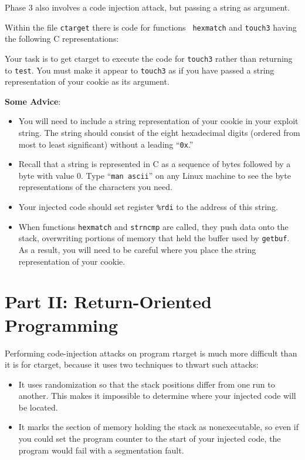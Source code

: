 \documentclass[11pt]{article}
\newcommand{\reg}[1]{\textrm{\texttt{\%#1}}}
\newcommand{\rdireg}{\reg{rdi}}
\newenvironment{ccode}%
{\small}%
{}
\begin{document}
Phase 3 also involves a code injection attack, but passing a string as argument.

Within the file {\tt ctarget} there is code for functions {\tt
  hexmatch} and {\tt touch3}
having the following C representations:

\begin{ccode}

\end{ccode}

Your task is to get {\sc ctarget} to execute the
code for {\tt touch3} rather than returning to {\tt test}.
You must make it appear to {\tt touch3} as if you have
passed a string representation of your cookie as its argument.

{\bf Some Advice}:
\begin{itemize}

\item You will need to include a string representation of your cookie
  in your exploit string.  The string should consist of the eight hexadecimal
  digits (ordered from most to least significant) without a leading ``\texttt{0x}.''

\item Recall that a string is represented in C as a sequence of bytes
  followed by a byte with value 0.  Type ``\texttt{man ascii}'' on any Linux
  machine to see the byte representations of the characters you need.

\item Your injected code should set register
\rdireg{}
to the address of this string.

\item When functions {\tt hexmatch} and {\tt strncmp} are called, they
  push data onto the stack, overwriting portions of memory that held
  the buffer used by {\tt getbuf}.  As a result, you will need to be careful where
  you place the string representation of your cookie.
\end{itemize}



\section{Part II: Return-Oriented Programming}

Performing code-injection attacks on program {\sc rtarget} is much
more difficult than it is for {\sc ctarget}, because it uses
two techniques to thwart such attacks:
\begin{itemize}
\item It uses randomization so that the stack positions differ from
  one run to another.  This makes it impossible to determine where your
  injected code will be located.
\item It marks the section of memory holding the stack as
  nonexecutable, so even if you could set the program counter to the
  start of your injected code, the program would fail with a
  segmentation fault.
\end{itemize}
\end{document}
